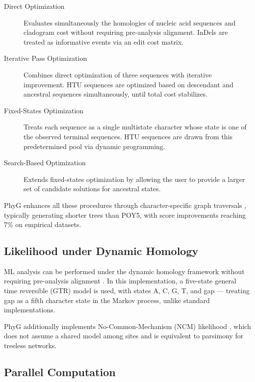 \begin{description}
    \item[Direct Optimization] \parencite{wheeler1996} Evaluates simultaneously the homologies of nucleic acid sequences and cladogram cost without requiring pre-analysis alignment. InDels are treated as informative events via an edit cost matrix.

    \item[Iterative Pass Optimization] \parencite{wheeler2003b} Combines direct optimization of three sequences with iterative improvement. HTU sequences are optimized based on descendant and ancestral sequences simultaneously, until total cost stabilizes.

    \item[Fixed-States Optimization] \parencite{wheeler1999a} Treats each sequence as a single multistate character whose state is one of the observed terminal sequences. HTU sequences are drawn from this predetermined pool via dynamic programming.

    \item[Search-Based Optimization] \parencite{wheeler2003c} Extends fixed-states optimization by allowing the user to provide a larger set of candidate solutions for ancestral states.
\end{description}

PhyG \parencite{wheeleretal2024} enhances all these procedures through character-specific graph traversals \parencite{varonwheeler2012}, typically generating shorter trees than POY5, with score improvements reaching 7\% on empirical datasets.

\subsection{Likelihood under Dynamic Homology}

ML analysis can be performed under the dynamic homology framework without requiring pre-analysis alignment \parencite{wheeleretal2006}. In this implementation, a five-state general time reversible (GTR) model is used, with states A, C, G, T, and gap --- treating gap as a fifth character state in the Markov process, unlike standard implementations.

PhyG \parencite{wheeleretal2024} additionally implements No-Common-Mechanism (NCM) likelihood \parencite{tuffleysteel1997}, which does not assume a shared model among sites and is equivalent to parsimony for treeless networks.

\subsection{Parallel Computation}


